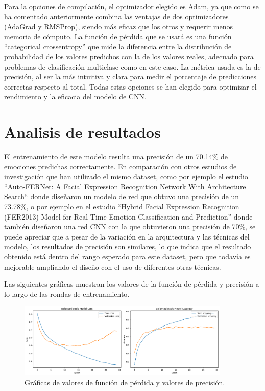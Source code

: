 \documentclass[12pt]{report} %
\begin{document}
\begin{enumerate}
\end{enumerate}

Para la opciones de compilación, el optimizador elegido es Adam, ya que como se ha comentado anteriormente combina las ventajas de dos optimizadores (AdaGrad y RMSProp), siendo más eficaz que los otros y requerir menos memoria de cómputo. La función de pérdida que se usará es una función “categorical crossentropy” que mide la diferencia entre la distribución de probabilidad de los valores predichos con la de los valores reales, adecuado para problemas de clasificación multiclase como en este caso. La métrica usada es la de precisión, al ser la más intuitiva y clara para medir el porcentaje de predicciones correctas respecto al total. Todas estas opciones se han elegido para optimizar el rendimiento y la eficacia del modelo de CNN.

\section{Analisis de resultados}

El entrenamiento de este modelo resulta una precisión de un 70.14\% de emociones predichas correctamente. En comparación con otros estudios de investigación que han utilizado el mismo dataset, como por ejemplo el estudio “Auto-FERNet: A Facial Expression Recognition Network With Architecture Search“ \cite{comparison1} donde diseñaron un modelo de red que obtuvo una precisión de un 73.78\%, o por ejemplo en el estudio “Hybrid Facial Expression Recognition (FER2013) Model for Real-Time Emotion Classification and Prediction” \cite{comparison2} donde también diseñaron una red  CNN con la que obtuvieron una precisión de 70\%, se puede apreciar que a pesar de la variación en la arquitectura y las técnicas del modelo, los resultados de precisión son similares, lo que indica que el resultado obtenido está dentro del rango esperado para este dataset, pero que todavía es mejorable ampliando el diseño con el uso de diferentes otras técnicas. 

Las siguientes gráficas muestran los valores de la función de pérdida y precisión a lo largo de las rondas de entrenamiento.

\begin{figure}[H]
	\centering
	\includegraphics[width=0.9\textwidth]{graficasEntrenamiento.png}
	\caption{Gráficas de valores de función de pérdida y valores de precisión.}
	\label{fig:imagen31}
\end{figure}
\end{document}

